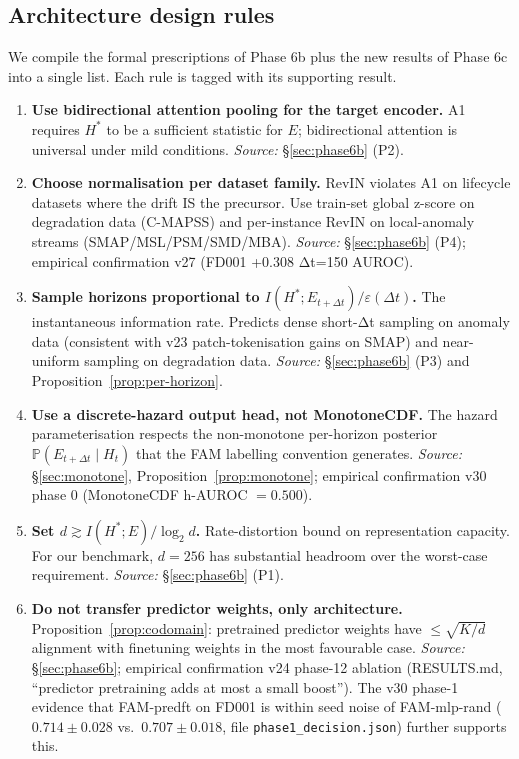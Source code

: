 \documentclass[11pt]{article}
\newcommand{\PP}{\mathbb{P}}
\begin{document}
\subsection{Architecture design rules}

We compile the formal prescriptions of Phase 6b plus the new results of
Phase 6c into a single list. Each rule is tagged with its supporting
result.

\begin{enumerate}[leftmargin=1.5em,label=(R\arabic*)]
\item \textbf{Use bidirectional attention pooling for the target encoder.}
A1 requires $H^*$ to be a sufficient statistic for $E$; bidirectional
attention is universal under mild conditions. \emph{Source:}
\S\ref{sec:phase6b} (P2).

\item \textbf{Choose normalisation per dataset family.}
RevIN violates A1 on lifecycle datasets where the drift IS the precursor.
Use train-set global z-score on degradation data (C-MAPSS) and per-instance
RevIN on local-anomaly streams (SMAP/MSL/PSM/SMD/MBA). \emph{Source:}
\S\ref{sec:phase6b} (P4); empirical confirmation v27 (FD001 +0.308 Δt=150 AUROC).

\item \textbf{Sample horizons proportional to $I(H^*;E_{t+\Delta t})/\varepsilon(\Delta t)$.}
The instantaneous information rate. Predicts dense short-Δt sampling on
anomaly data (consistent with v23 patch-tokenisation gains on SMAP) and
near-uniform sampling on degradation data. \emph{Source:} \S\ref{sec:phase6b}
(P3) and Proposition~\ref{prop:per-horizon}.

\item \textbf{Use a discrete-hazard output head, not MonotoneCDF.}
The hazard parameterisation respects the non-monotone per-horizon
posterior $\PP(E_{t+\Delta t}\mid H_t)$ that the FAM labelling
convention generates. \emph{Source:} \S\ref{sec:monotone},
Proposition~\ref{prop:monotone}; empirical confirmation v30 phase 0
(MonotoneCDF h-AUROC $=0.500$).

\item \textbf{Set $d\gtrsim I(H^*;E)/\log_2 d$.}
Rate-distortion bound on representation capacity. For our benchmark,
$d=256$ has substantial headroom over the worst-case requirement.
\emph{Source:} \S\ref{sec:phase6b} (P1).

\item \textbf{Do not transfer predictor weights, only architecture.}
Proposition~\ref{prop:codomain}: pretrained predictor weights have
$\le\sqrt{K/d}$ alignment with finetuning weights in the most favourable
case. \emph{Source:} \S\ref{sec:phase6b}; empirical confirmation v24
phase-12 ablation (RESULTS.md, ``predictor pretraining adds at most a
small boost''). The v30 phase-1 evidence that FAM-predft on FD001 is
within seed noise of FAM-mlp-rand ($0.714\pm 0.028$ vs.\ $0.707\pm 0.018$,
file \texttt{phase1\_decision.json}) further supports this.


\end{enumerate}
\end{document}
